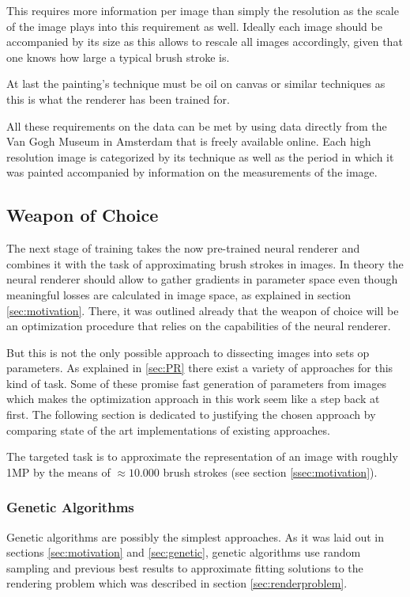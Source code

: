 This requires more information per image than simply the resolution as the scale
of the image plays into this requirement as well.
Ideally each image should be accompanied by its size as this allows to rescale all 
images accordingly, given that one knows how large a typical brush stroke is.

At last the painting's technique must be oil on canvas or similar techniques as this
is what the renderer has been trained for.

All these requirements on the data can be met by using data directly from the Van
Gogh Museum in Amsterdam that is freely available online.
Each high resolution image is categorized by its technique as well as the period
in which it was painted accompanied by information on the measurements of the image.

\subsection{Weapon of Choice}
The next stage of training takes the now pre-trained neural renderer and combines
it with the task of approximating brush strokes in images.
In theory the neural renderer should allow to gather gradients in parameter space
even though meaningful losses are calculated in image space, as explained in section
\ref{sec:motivation}.
There, it was outlined already that the weapon of choice will be an optimization
procedure that relies on the capabilities of the neural renderer.

But this is not the only possible approach to dissecting images into sets op parameters.
As explained in \ref{sec:PR} there exist a variety of approaches for this kind of
task.
Some of these promise fast generation of parameters from images which makes the 
optimization approach in this work seem like a step back at first.
The following section is dedicated to justifying the chosen approach by comparing
state of the art implementations of existing approaches.

The targeted task is to approximate the representation of an image with roughly
1MP by the means of $\approx 10.000$ brush strokes (see section \ref{ssec:motivation}).

\subsubsection{Genetic Algorithms}
Genetic algorithms are possibly the simplest approaches.
As it was laid out in sections \ref{sec:motivation} and \ref{sec:genetic}, genetic
algorithms use random sampling and previous best results to approximate fitting
solutions to the rendering problem which was described in section \ref{sec:renderproblem}.

